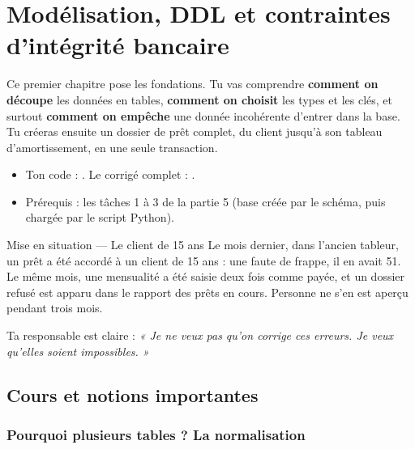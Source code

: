 \chapter{Modélisation, DDL et contraintes d'intégrité bancaire}


Ce premier chapitre pose les fondations. Tu vas comprendre \textbf{comment on découpe} les données en
tables, \textbf{comment on choisit} les types et les clés, et surtout \textbf{comment on empêche} une
donnée incohérente d'entrer dans la base. Tu créeras ensuite un dossier de prêt complet, du client
jusqu'à son tableau d'amortissement, en une seule transaction.

\begin{observation}
\begin{itemize}
\item Ton code : . Le corrigé complet : .
\item Prérequis : les tâches 1 à 3 de la partie 5 (base créée par le schéma, puis chargée par le
script Python).
\end{itemize}
\end{observation}

\begin{situation}{Mise en situation --- Le client de 15 ans}
Le mois dernier, dans l'ancien tableur, un prêt a été accordé à un client de 15 ans : une faute de
frappe, il en avait 51. Le même mois, une mensualité a été saisie deux fois comme payée, et un dossier
refusé est apparu dans le rapport des prêts en cours. Personne ne s'en est aperçu pendant trois mois.

Ta responsable est claire : \emph{« Je ne veux pas qu'on corrige ces erreurs. Je veux qu'elles soient
impossibles. »}
\end{situation}

\section{Cours et notions importantes}

\subsection{Pourquoi plusieurs tables ? La normalisation}


